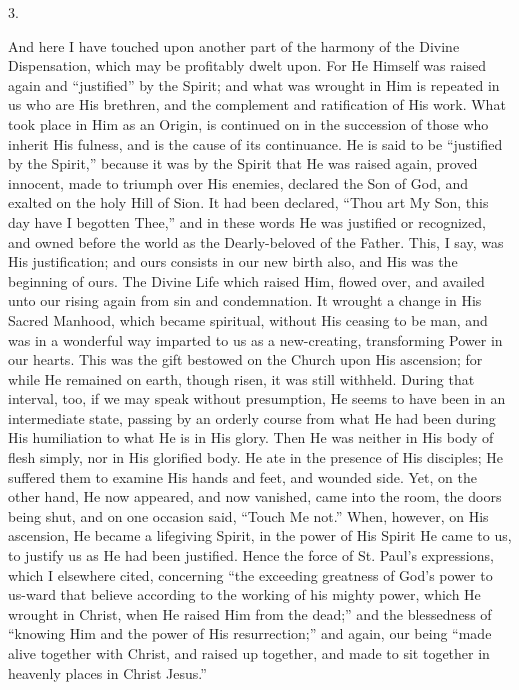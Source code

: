 3.

And here I have touched upon another part of the harmony of the
Divine Dispensation, which may be profitably dwelt upon. For He
Himself was raised again and ``justified'' by the Spirit; and
what was wrought in Him is repeated in us who are His brethren,
and the complement and ratification of His work. What took place in
Him as an Origin, is continued on in the succession of those who
inherit His fulness, and is the cause of its continuance. He is said
to be ``justified by the Spirit,'' because it was by the
Spirit that He was raised again, proved innocent, made to triumph over
His enemies, declared the Son of God, and exalted on the holy Hill of
Sion. It had been declared, ``Thou art My Son, this day have I
begotten Thee,'' and in these words He was justified or
recognized, and owned before the world as the Dearly-beloved of the
Father. This, I say, was His justification; and ours consists in our
new birth also, and His was the beginning of ours. The Divine Life
which raised Him, flowed over, and availed unto our rising again from
sin and condemnation. It wrought a change in His Sacred Manhood, which
became spiritual, without His ceasing to be man, and was in a
wonderful way imparted to us as a new-creating, transforming Power in
our hearts. This was the gift bestowed on the Church upon His
ascension; for while He remained on earth, though risen, it was still
withheld. During that interval, too, if we may speak without
presumption, He seems to have been in an intermediate state, passing
by an orderly course from what He had been during His humiliation to
what He is in His glory. Then He was neither in His body of flesh
simply, nor in His glorified body. He ate in the presence of His
disciples; He suffered them to examine His hands and feet, and wounded
side. Yet, on the other hand, He now appeared, and now vanished, came
into the room, the doors being shut, and on one occasion said,
``Touch Me not.'' When, however, on His ascension, He became a
lifegiving Spirit, in the power of His Spirit He came to us, to
justify us as He had been justified. Hence the force of St. Paul's
expressions, which I elsewhere cited, concerning ``the exceeding
greatness of God's power to us-ward that believe according to the
working of his mighty power, which He wrought in Christ, when He
raised Him from the dead;'' and the blessedness of ``knowing
Him and the power of His resurrection;'' and again, our being
``made alive together with Christ, and raised up together, and
made to sit together in heavenly places in Christ Jesus.''

